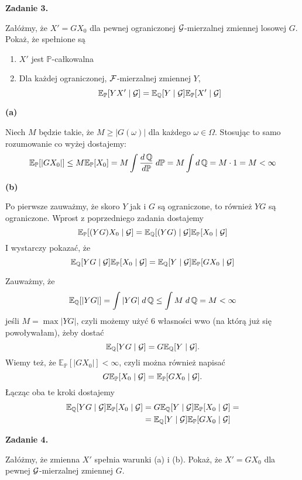 \documentclass{article}
\newcommand{\E}{\mathbb{E}}
\renewcommand{\P}{\mathbb{P}}
\begin{document}
{\bfseries{\large\color{orange}Zadanie 3.}

  Załóżmy, że $X'=GX_0$ dla pewnej ograniczonej $\mathcal{G}$-mierzalnej zmiennej losowej $G$. Pokaż, że spełnione są
  \begin{enumerate}[label=(\alph*)]
    \item $X'$ jest $\P$-całkowalna
    \item Dla każdej ograniczonej, $\mathcal{F}$-mierzalnej zmiennej $Y$,
      $$\E_{\P}[YX'\;|\;\set{G}]=\E_{\Q}[Y\;|\;\set{G}]\E_{\P}[X'\;|\;\set{G}]$$
  \end{enumerate}
}

\textbf{\color{green}(a)}

Niech $M$ będzie takie, że $M\geq |G(\omega)|$ dla każdego $\omega\in\Omega$. Stosując to samo rozumowanie co wyżej dostajemy:
\begin{align*}
  \E_{\P}[|GX_0|]\leq M\E_{\P}[X_0]=M\int\frac{d\Q}{d\P}\;d\P=M\int d\Q=M\cdot 1=M<\infty
\end{align*}

\textbf{\color{green}(b)}

Po pierwsze zauważmy, że skoro $Y$ jak i $G$ są ograniczone, to również $YG$ są ograniczone. Wprost z poprzedniego zadania dostajemy
$$\E_{\P}[(YG)X_0\;|\;\set{G}]=\E_{\Q}[(YG)\;|\;\set{G}]\E_{\P}[X_0\;|\;\set{G}]$$
I wystarczy pokazać, że 
$$\E_{\Q}[YG\;|\;\set{G}]\E_{\P}[X_0\;|\;\set{G}]=\E_{\Q}[Y\;|\;\set{G}]\E_{\P}[GX_0\;|\;\set{G}]$$

Zauważmy, że
$$\E_{\Q}[|YG|]=\int|YG|\;d\Q\leq \int M\;d\Q=M<\infty$$
jeśli $M=\max|YG|$, czyli możemy użyć 6 własności wwo (na którą już się powoływałam), żeby dostać
$$\E_{\Q}[YG\;|\;\set{G}]=G\E_{\Q}[Y\;|\;\set{G}].$$
Wiemy też, że $\E_{\P}[|GX_0|]<\infty$, czyli można również napisać
$$G\E_{\P}[X_0\;|\;\set{G}]=\E_{\P}[GX_0\;|\;\set{G}].$$
Łącząc oba te kroki dostajemy
\begin{align*}
  \E_{\Q}[YG\;|\;\set{G}]\E_{\P}[X_0\;|\;\set{G}]&=G\E_{\Q}[Y\;|\;\set{G}]\E_{\P}[X_0\;|\;\set{G}]=\\
      &=\E_{\Q}[Y\;|\;\set{G}]\E_{\P}[GX_0\;|\;\set{G}]
\end{align*}
\bigskip

{\bfseries{\large\color{orange}Zadanie 4.}
  
  Załóżmy, że zmienna $X'$ spełnia warunki (a) i (b). Pokaż, że $X'=GX_0$ dla pewnej $\mathcal{G}$-mierzalnej zmiennej $G$.
}
\medskip

%
%
\end{document}
